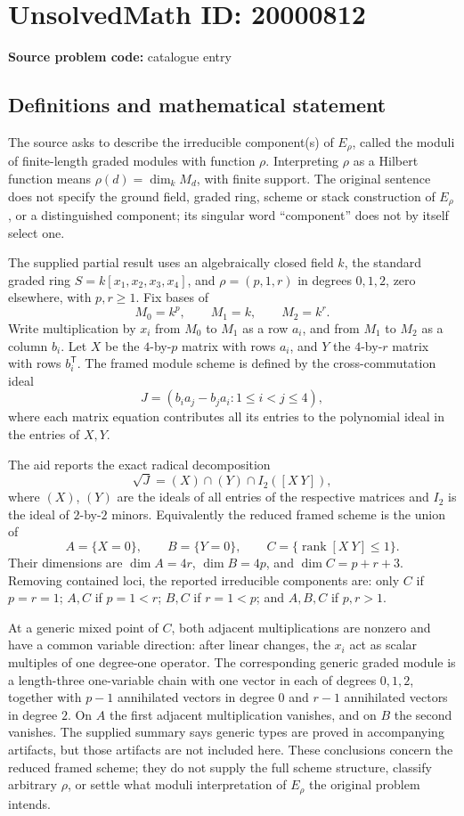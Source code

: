 \documentclass[11pt]{article}
\begin{document}
\section*{UnsolvedMath ID: 20000812}
\textbf{Source problem code:} catalogue entry
\subsection{Definitions and mathematical statement}
The source asks to describe the irreducible component(s) of \(E_\rho\), called the moduli of finite-length graded modules with function \(\rho\). Interpreting \(\rho\) as a Hilbert function means \(\rho(d)=\dim_kM_d\), with finite support. The original sentence does not specify the ground field, graded ring, scheme or stack construction of \(E_\rho\), or a distinguished component; its singular word ``component'' does not by itself select one.

The supplied partial result uses an algebraically closed field \(k\), the standard graded ring \(S=k[x_1,x_2,x_3,x_4]\), and \(\rho=(p,1,r)\) in degrees \(0,1,2\), zero elsewhere, with \(p,r\ge1\). Fix bases of
\[
 M_0=k^p,\qquad M_1=k,\qquad M_2=k^r.
\]
Write multiplication by \(x_i\) from \(M_0\) to \(M_1\) as a row \(a_i\), and from \(M_1\) to \(M_2\) as a column \(b_i\). Let \(X\) be the \(4\)-by-\(p\) matrix with rows \(a_i\), and \(Y\) the \(4\)-by-\(r\) matrix with rows \(b_i^{\mathsf T}\). The framed module scheme is defined by the cross-commutation ideal
\[
 J=(b_i a_j-b_j a_i:1\le i<j\le4),
\]
where each matrix equation contributes all its entries to the polynomial ideal in the entries of \(X,Y\).

The aid reports the exact radical decomposition
\[
 \sqrt J=(X)\cap(Y)\cap I_2([X\ Y]),
\]
where \((X)\), \((Y)\) are the ideals of all entries of the respective matrices and \(I_2\) is the ideal of \(2\)-by-\(2\) minors. Equivalently the reduced framed scheme is the union of
\[
 A=\{X=0\},\qquad B=\{Y=0\},\qquad
 C=\{\operatorname{rank}[X\ Y]\le1\}.
\]
Their dimensions are \(\dim A=4r\), \(\dim B=4p\), and \(\dim C=p+r+3\). Removing contained loci, the reported irreducible components are: only \(C\) if \(p=r=1\); \(A,C\) if \(p=1<r\); \(B,C\) if \(r=1<p\); and \(A,B,C\) if \(p,r>1\).

At a generic mixed point of \(C\), both adjacent multiplications are nonzero and have a common variable direction: after linear changes, the \(x_i\) act as scalar multiples of one degree-one operator. The corresponding generic graded module is a length-three one-variable chain with one vector in each of degrees \(0,1,2\), together with \(p-1\) annihilated vectors in degree \(0\) and \(r-1\) annihilated vectors in degree \(2\). On \(A\) the first adjacent multiplication vanishes, and on \(B\) the second vanishes. The supplied summary says generic types are proved in accompanying artifacts, but those artifacts are not included here. These conclusions concern the reduced framed scheme; they do not supply the full scheme structure, classify arbitrary \(\rho\), or settle what moduli interpretation of \(E_\rho\) the original problem intends.
\end{document}
